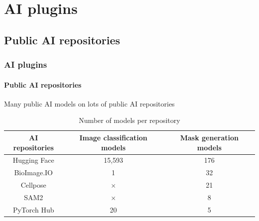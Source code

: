 \def\sectiontitle{AI plugins}

\section{\sectiontitle}

\def\slidetitle{Public AI repositories}

\subsection{\slidetitle}
\begin{frame}
  \frametitle{\sectiontitle}
  \framesubtitle{\slidetitle}

  Many public AI models on lots of public AI repositories

  \begin{center}
    \begin{table}
      \begin{tabular}{|c|c|c|}
       \hline
       \rowcolor{tableFirstRowColor} AI repositories & Image classification models & Mask generation models \\ [0.5ex]
       \hline
       \cellcolor{tableFirstColColor} Hugging Face & 15,593 & 176 \\
       \hline
       \cellcolor{tableFirstColColor} BioImage.IO & 1 & 32 \\
       \hline
       \cellcolor{tableFirstColColor} Cellpose & $\times$ & 21 \\
       \hline
       \cellcolor{tableFirstColColor} SAM2 & $\times$ & 8 \\
       \hline
       \cellcolor{tableFirstColColor} PyTorch Hub & 20 & 5 \\
       \hline
      \end{tabular}
      \caption{Number of models per repository}
    \end{table}
  \end{center}
\end{frame}

\def\slidetitle{Unlock theses repositories}


